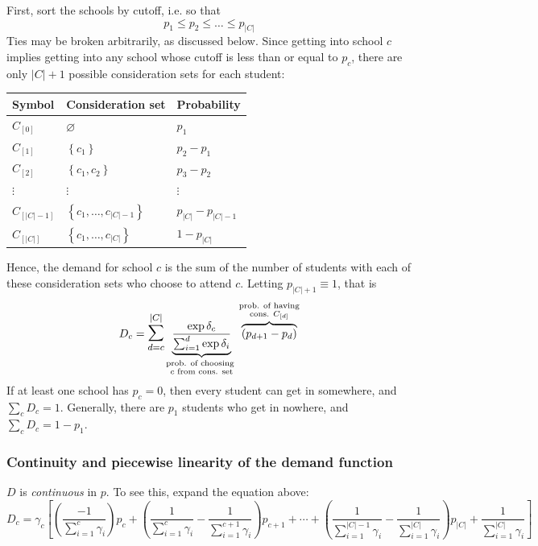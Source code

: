 \documentclass[12pt]{article}
\theoremstyle{definition}
\begin{document}
First, sort the schools by cutoff, i.e. so that
\[p_1 \leq p_2 \leq \dots \leq p_{|C|}\]
Ties may be broken arbitrarily, as discussed below. Since getting into school $c$ implies getting into any school whose cutoff is less than or equal to $p_c$, there are only $|C| + 1$ possible consideration sets for each student: 
\begin{center}
\begin{tabular}{lll}
\textbf{Symbol} & \textbf{Consideration set} & \textbf{Probability} \\ \hline
$C_{[0]}$    & $\varnothing$    & $p_1$                  \\
$C_{[1]}$    & $\left\{ c_1 \right\}$    & $p_2 - p_1$               \\
$C_{[2]}$    & $\left\{ c_1, c_2 \right\}$    & $p_3 - p_2$               \\
$\vdots$ & $\vdots$ & $\vdots$ \\
$C_{[|C| - 1]}$           & $\left\{ c_1, \dots, c_{|C| - 1} \right\}$     & $p_{|C|} - p_{|C|-1}$             \\
$C_{[|C|]}$           & $\left\{ c_1, \dots, c_{|C|} \right\}$     & $1 - p_{|C|}$                 
\end{tabular}
\end{center}
Hence, the demand for school $c$ is the sum of the number of students with each of these consideration sets who choose to attend $c$. Letting $p_{|C|+1} \equiv 1$, that is
\begin{equation}D_c = \mathlarger{\mathlarger{\sum}}_{d=c}^{|C|} 
\underbrace{\frac{\exp{\delta_c}}{ \sum_{i=1}^d \exp{\delta_i}}}_{\substack{\text{prob. of choosing  }\\ c\text{ from cons. set}}} 
\overbrace{\left(p_{d+1} - p_{d}\right)}^{\substack{\text{prob. of having}\\ \text{cons. }C_{[d]}}} 
\label{mnlonetestdemand}\end{equation}
If at least one school has $p_c = 0$, then every student can get in somewhere, and $\sum_c D_c = 1$. Generally, there are $p_1$ students who get in nowhere, and $\sum_c D_c = 1 - p_1$.

\subsubsection{Continuity and piecewise linearity of the demand function}
$D$ is \emph{continuous} in $p$. To see this, expand the equation above:
\scriptsize\[D_c = \gamma_c \left[ \left(\frac{-1}{\sum_{i=1}^c \gamma_i}\right) p_c
+ \left(\frac{1}{\sum_{i=1}^{c} \gamma_i} - \frac{1}{\sum_{i=1}^{c+1} \gamma_i} \right) p_{c+1}
+ \cdots
+ \left(\frac{1}{\sum_{i=1}^{|C|-1} \gamma_i} - \frac{1}{\sum_{i=1}^{|C|} \gamma_i}\right) p_{|C|}
+ \frac{1}{\sum_{i=1}^{|C|} \gamma_i}
\right]\]
\end{document}
